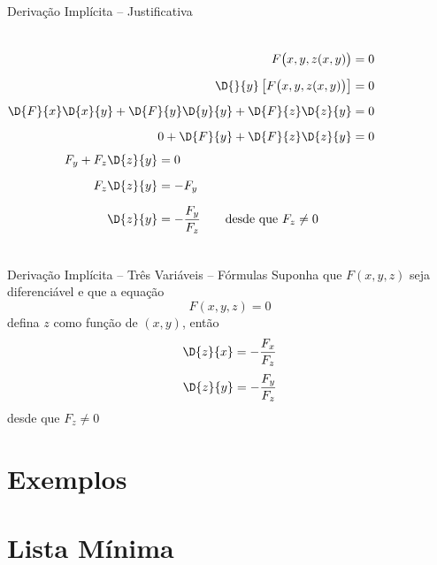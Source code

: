 \begin{proofframe}{Derivação Implícita -- Justificativa}
  \begin{columns}
    \begin{align*}
      F\big(x, y, z(x, y)\big)                               & = 0 \\[2mm]
      \D{}{y}\left[F\big(x, y, z(x, y)\big)\right]           & = 0 \\[2mm]
      \D{F}{x}\D{x}{y} + \D{F}{y}\D{y}{y} + \D{F}{z}\D{z}{y} & = 0 \\[2mm]
      0 + \D{F}{y} + \D{F}{z}\D{z}{y}                        & = 0
    \end{align*}
    \begin{align*}
      F_y + F_z \D{z}{y} & = 0                   \\[2mm]
      F_z \D{z}{y}       & = - F_y               \\[2mm]
      \D{z}{y}           & = - \frac{F_y}{F_z} \qquad \text{desde que } F_z \neq 0
    \end{align*}
  \end{columns}
\end{proofframe}

\begin{frame}{Derivação Implícita -- Três Variáveis -- Fórmulas}
  Suponha que $F(x, y, z)$ seja diferenciável e que a equação
  \[
    F(x, y, z) = 0
  \]
  defina $z$ como função de $(x, y)$, então
  \[
    \D{z}{x} = -\frac{F_x}{F_z}
  \]
  \[
    \D{z}{y} = -\frac{F_y}{F_z}
  \]
  desde que \(F_z \neq 0\)
\end{frame}



\section{Exemplos}




\section{Lista Mínima}

